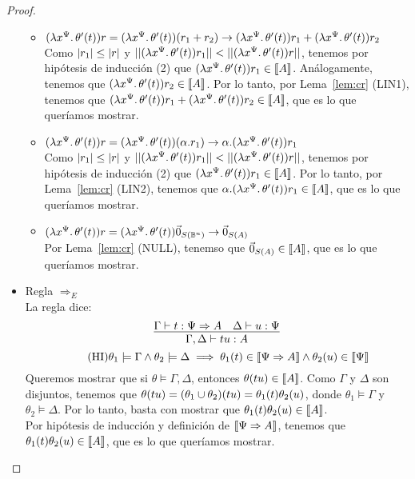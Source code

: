 \begin{proof}
\begin{itemize}
\begin{itemize}
      \item \( (\lambda x^{\Psi}\ldotp\theta'(t)) r = (\lambda x^{\Psi}\ldotp\theta'(t)) (r_1 + r_2) \rightarrow (\lambda x^{\Psi}\ldotp\theta'(t)) r_1 + (\lambda x^{\Psi}\ldotp\theta'(t)) r_2 \)
        \\ Como \( |r_1| \leq |r| \) y \( ||(\lambda x^{\Psi}\ldotp\theta'(t)) r_1|| < ||(\lambda x^{\Psi}\ldotp\theta'(t)) r|| \), tenemos por hipótesis de inducción (2) que \( (\lambda x^{\Psi}\ldotp\theta'(t)) r_1 \in \llbracket A\rrbracket \). Análogamente, tenemos que \( (\lambda x^{\Psi}\ldotp\theta'(t)) r_2 \in \llbracket A\rrbracket \). Por lo tanto, por Lema~\ref{lem:cr} (LIN1), tenemos que \( (\lambda x^{\Psi}\ldotp\theta'(t)) r_1 + (\lambda x^{\Psi}\ldotp\theta'(t)) r_2 \in \llbracket A\rrbracket \), que es lo que queríamos mostrar.
      \item \( (\lambda x^{\Psi}\ldotp\theta'(t)) r = (\lambda x^{\Psi}\ldotp\theta'(t)) (\alpha . r_1) \rightarrow \alpha . (\lambda x^{\Psi}\ldotp\theta'(t)) r_1 \)
        \\ Como \( |r_1| \leq |r| \) y \( ||(\lambda x^{\Psi}\ldotp\theta'(t)) r_1|| < ||(\lambda x^{\Psi}\ldotp\theta'(t)) r|| \), tenemos por hipótesis de inducción (2) que \( (\lambda x^{\Psi}\ldotp\theta'(t)) r_1 \in \llbracket A\rrbracket \). Por lo tanto, por Lema~\ref{lem:cr} (LIN2), tenemos que \( \alpha . (\lambda x^{\Psi}\ldotp\theta'(t)) r_1 \in \llbracket A\rrbracket \), que es lo que queríamos mostrar.
      \item \( (\lambda x^{\Psi}\ldotp\theta'(t)) r = (\lambda x^{\Psi}\ldotp\theta'(t)) \vec{0}_{S (\mathbb{B}^n)} \rightarrow \vec{0}_{S (A)} \)
        \\ Por Lema~\ref{lem:cr} (NULL), tenemso que \( \vec{0}_{S (A)} \in \llbracket A\rrbracket \), que es lo que queríamos mostrar.
    \end{itemize}

    \item Regla \( \Rightarrow_E \)
    \\ La regla dice:
    \[ \infer{\Gamma, \Delta \vdash \app{t}{u} : A}{\Gamma \vdash t : \Psi \Rightarrow A & \Delta \vdash u : \Psi} \]
    \[
      \tag{HI}
      \theta_1 \models \Gamma \land \theta_2 \models \Delta
      \implies \theta_1(t) \in \llbracket\Psi \Rightarrow A\rrbracket \land \theta_2(u) \in \llbracket\Psi\rrbracket
    \]
    Queremos mostrar que si \( \theta \models \Gamma, \Delta \), entonces \( \theta(t u) \in \llbracket A\rrbracket \).
    Como \( \Gamma \) y \( \Delta \) son disjuntos, tenemos que \( \theta(t u) = (\theta_1 \cup \theta_2)(t u) = \theta_1(t) \theta_2(u) \), donde \( \theta_1 \models \Gamma \) y \( \theta_2 \models \Delta \).
    Por lo tanto, basta con mostrar que \( \theta_1(t) \theta_2(u) \in \llbracket A\rrbracket \).
    \\ Por hipótesis de inducción y definición de \( \llbracket\Psi \Rightarrow A\rrbracket \), tenemos que \( \theta_1(t) \theta_2(u) \in \llbracket A\rrbracket \), que es lo que queríamos mostrar.


\end{itemize}
\end{proof}
